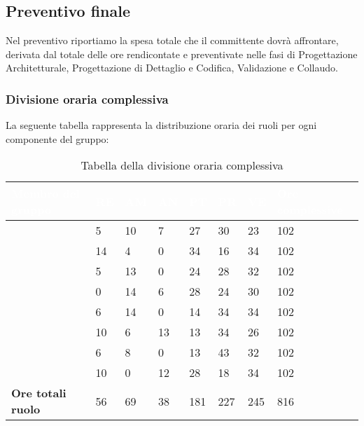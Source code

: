\subsection{Preventivo finale} 
Nel preventivo riportiamo la spesa totale che il committente dovrà affrontare, derivata dal totale delle ore rendicontate e preventivate nelle fasi di Progettazione Architetturale, Progettazione di Dettaglio e Codifica, Validazione e Collaudo.

\subsubsection{Divisione oraria complessiva} 
La seguente tabella rappresenta la distribuzione oraria dei ruoli per ogni componente del gruppo:
{
\renewcommand{\arraystretch}{2}
\centering
\begin{longtable}[h!] { C{4cm} C{1cm} C{1cm} C{1cm} C{1cm} C{1cm} C{1cm} C{3cm}}
\caption{Tabella della divisione oraria complessiva}\\

\textcolor{white}{\textbf{Membro del gruppo}} & 
\textcolor{white}{\textbf{RE}} & 
\textcolor{white}{\textbf{AM}} & 
\textcolor{white}{\textbf{AN}} & 
\textcolor{white}{\textbf{PT}} & 
\textcolor{white}{\textbf{PR}} & 
\textcolor{white}{\textbf{VE}} & 
\textcolor{white}{\textbf{Ore complessive}}\\	
\endhead
        
\MC{}                     &  5 & 10 &  7 &  27 &  30 &  23 & 102 \\
\LD{}                     & 14 &  4 &  0 &  34 &  16 &  34 & 102 \\
\CE{}                     &  5 & 13 &  0 &  24 &  28 &  32 & 102 \\
\SE{}                     &  0 & 14 &  6 &  28 &  24 &  30 & 102 \\
\PF{}                     &  6 & 14 &  0 &  14 &  34 &  34 & 102 \\
\DF{}                     & 10 &  6 & 13 &  13 &  34 &  26 & 102 \\
\BR{}                     &  6 &  8 &  0 &  13 &  43 &  32 & 102 \\
\AT{}                     & 10 &  0 & 12 &  28 &  18 &  34 & 102 \\
\textbf{Ore totali ruolo} & 56 & 69 & 38 & 181 & 227 & 245 & 816 \\

\end{longtable}
}

